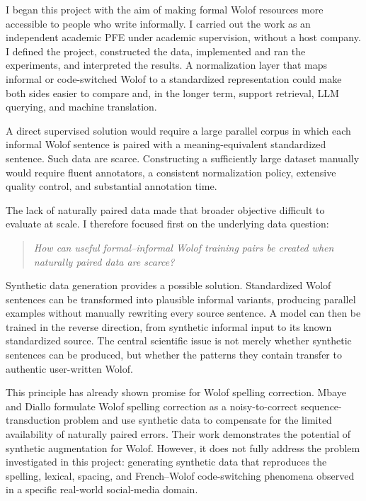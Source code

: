 \documentclass[12pt, a4paper, twoside, openany]{report}
\begin{document}
I began this project with the aim of making formal Wolof resources more accessible to people who write informally. I carried out the work as an independent academic PFE under academic supervision, without a host company. I defined the project, constructed the data, implemented and ran the experiments, and interpreted the results. A normalization layer that maps informal or code-switched Wolof to a standardized representation could make both sides easier to compare and, in the longer term, support retrieval, \ac{LLM} querying, and machine translation.

A direct supervised solution would require a large parallel corpus in which each informal Wolof sentence is paired with a meaning-equivalent standardized sentence. Such data are scarce. Constructing a sufficiently large dataset manually would require fluent annotators, a consistent normalization policy, extensive quality control, and substantial annotation time.

The lack of naturally paired data made that broader objective difficult to evaluate at scale. I therefore focused first on the underlying data question:

\begin{quote}
	\textit{How can useful formal--informal Wolof training pairs be created when naturally paired data are scarce?}
\end{quote}

Synthetic data generation provides a possible solution. Standardized Wolof sentences can be transformed into plausible informal variants, producing parallel examples without manually rewriting every source sentence. A model can then be trained in the reverse direction, from synthetic informal input to its known standardized source. The central scientific issue is not merely whether synthetic sentences can be produced, but whether the patterns they contain transfer to authentic user-written Wolof.

This principle has already shown promise for Wolof spelling correction. Mbaye and Diallo \cite{mbaye2025beqi} formulate Wolof spelling correction as a noisy-to-correct sequence-transduction problem and use synthetic data to compensate for the limited availability of naturally paired errors. Their work demonstrates the potential of synthetic augmentation for Wolof. However, it does not fully address the problem investigated in this project: generating synthetic data that reproduces the spelling, lexical, spacing, and French--Wolof code-switching phenomena observed in a specific real-world social-media domain.
\end{document}
